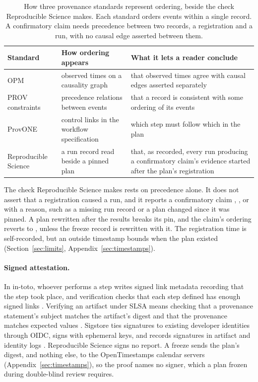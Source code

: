 \vspace{0.5\baselineskip}
\begin{table}[H]
\centering
\small
\caption{How three provenance standards represent ordering, beside the check Reproducible Science makes.
Each standard orders events within a single record. A confirmatory claim needs precedence
between two records, a registration and a run, with no causal edge asserted between them.}
\label{tab:ordering}
\begin{tabular}{@{}>{\raggedright\arraybackslash}p{}>{\raggedright\arraybackslash}p{}>{\raggedright\arraybackslash}p{}@{}}
\toprule
\textbf{Standard} & \textbf{How ordering appears} & \textbf{What it lets a reader conclude} \\
\midrule
OPM & observed times on a causality graph & that observed times agree with causal edges asserted separately \\
PROV constraints & precedence relations between events & that a record is consistent with some ordering of its events \\
ProvONE & control links in the workflow specification & which step must follow which in the plan \\
Reproducible Science & a run record read beside a pinned plan & that, as recorded, every run producing a confirmatory claim's evidence started after the plan's registration \\
\bottomrule
\end{tabular}
\end{table}

The check Reproducible Science makes rests on precedence alone. It does not assert that a registration caused a
run, and it reports a confirmatory claim , , or  with
a reason, such as a missing run record or a plan changed since it was pinned. A plan rewritten
after the results breaks its pin, and the claim's ordering reverts to , unless the
freeze record is rewritten with it. The registration time is self-recorded, but an outside timestamp bounds when the plan existed
(Section~\ref{sec:limits}, Appendix~\ref{sec:timestamps}).

\paragraph{Signed attestation.} In in-toto, whoever performs a step writes signed link metadata
recording that the step took place, and verification checks that each step defined has enough
signed links \citep{torresarias2019intoto}. Verifying an
artifact under SLSA means checking that a provenance statement's subject matches the artifact's
digest and that the provenance matches expected values \citep{openssf2023slsa}. Sigstore ties
signatures to existing developer identities through OIDC, signs with ephemeral keys, and records
signatures in artifact and identity logs \citep{newman2022sigstore}. Reproducible Science signs no report.
A freeze sends the plan's digest, and nothing else, to the OpenTimestamps calendar servers
(Appendix~\ref{sec:timestamps}), so the proof names no signer, which a plan frozen during
double-blind review requires.

